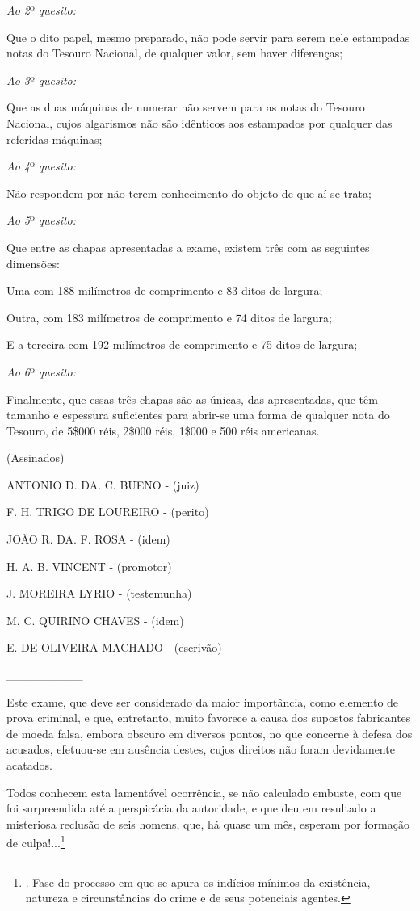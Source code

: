 \emph{Ao 2}º \emph{quesito:}

Que o dito papel, mesmo preparado, não pode servir para serem nele
estampadas notas do Tesouro Nacional, de qualquer valor, sem haver
diferenças;

\emph{Ao 3}º \emph{quesito:}

Que as duas máquinas de numerar não servem para as notas do Tesouro
Nacional, cujos algarismos não são idênticos aos estampados por qualquer
das referidas máquinas;

\emph{Ao 4}º \emph{quesito:}

Não respondem por não terem conhecimento do objeto de que aí se trata;

\emph{Ao 5}º \emph{quesito:}

Que entre as chapas apresentadas a exame, existem três com as seguintes
dimensões:

Uma com 188 milímetros de comprimento e 83 ditos de largura;

Outra, com 183 milímetros de comprimento e 74 ditos de largura;

E a terceira com 192 milímetros de comprimento e 75 ditos de largura;

\emph{Ao 6}º \emph{quesito:}

Finalmente, que essas três chapas são as únicas, das apresentadas, que
têm tamanho e espessura suficientes para abrir-se uma forma de qualquer
nota do Tesouro, de 5\$000 réis, 2\$000 réis, 1\$000 e 500 réis
americanas.

(Assinados)

ANTONIO D. DA. C. BUENO - (juiz)

F. H. TRIGO DE LOUREIRO - (perito)

JOÃO R. DA. F. ROSA - (idem)

H. A. B. VINCENT - (promotor)

J. MOREIRA LYRIO - (testemunha)

M. C. QUIRINO CHAVES - (idem)

E. DE OLIVEIRA MACHADO - (escrivão)

\_\_\_\_\_\_\_\_\_

Este exame, que deve ser considerado da maior importância, como elemento
de prova criminal, e que, entretanto, muito favorece a causa dos
supostos fabricantes de moeda falsa, embora obscuro em diversos pontos,
no que concerne à defesa dos acusados, efetuou-se em ausência destes,
cujos direitos não foram devidamente acatados.

Todos conhecem esta lamentável ocorrência, se não calculado embuste, com
que foi surpreendida até a perspicácia da autoridade, e que deu em
resultado a misteriosa reclusão de seis homens, que, há quase um mês,
esperam por formação de culpa!...\footnote{. Fase do processo em que se
  apura os indícios mínimos da existência, natureza e circunstâncias do
  crime e de seus potenciais agentes.}

